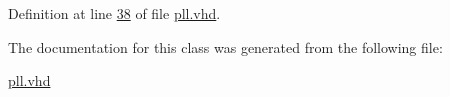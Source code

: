 \hypertarget{classpll_acd03516902501cd1c7296a98e22c6fcb}{}
\subsubsection[{std\+\_\+logic\+\_\+1164}]{\hspace{0.3cm}{\ttfamily [Package]}}\label{classpll_acd03516902501cd1c7296a98e22c6fcb}


Definition at line \hyperlink{pll_8vhd_source_l00038}{38} of file \hyperlink{pll_8vhd_source}{pll.\+vhd}.



The documentation for this class was generated from the following file\+:\begin{DoxyCompactItemize}
\item 
\hyperlink{pll_8vhd}{pll.\+vhd}\end{DoxyCompactItemize}
